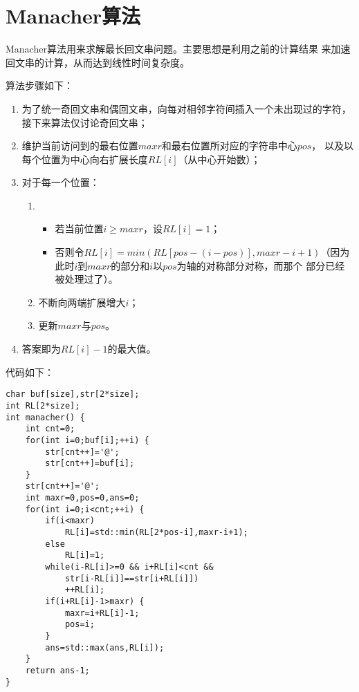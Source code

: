 \section{Manacher算法}
Manacher算法用来求解最长回文串问题。主要思想是利用之前的计算结果
来加速回文串的计算，从而达到线性时间复杂度。

算法步骤如下：
\begin{enumerate}
    \item 为了统一奇回文串和偶回文串，向每对相邻字符间插入一个未出现过的字符，
    接下来算法仅讨论奇回文串；
    \item 维护当前访问到的最右位置$maxr$和最右位置所对应的字符串中心$pos$，
    以及以每个位置为中心向右扩展长度$RL[i]$（从中心开始数）；
    \item 对于每一个位置：
    \begin{enumerate}
        \item
        \begin{itemize}
            \item 若当前位置$i\geq maxr$，设$RL[i]=1$；
            \item 否则令$RL[i]=min(RL[pos-(i-pos)],maxr-i+1)$（因为
            此时$i$到$maxr$的部分和$i$以$pos$为轴的对称部分对称，而那个
            部分已经被处理过了）。
        \end{itemize}
        \item 不断向两端扩展增大$i$；
        \item 更新$maxr$与$pos$。
    \end{enumerate}
    \item 答案即为$RL[i]-1$的最大值。
\end{enumerate}

代码如下：
\begin{lstlisting}
char buf[size],str[2*size];
int RL[2*size];
int manacher() {
    int cnt=0;
    for(int i=0;buf[i];++i) {
        str[cnt++]='@';
        str[cnt++]=buf[i];
    }
    str[cnt++]='@';
    int maxr=0,pos=0,ans=0;
    for(int i=0;i<cnt;++i) {
        if(i<maxr)
            RL[i]=std::min(RL[2*pos-i],maxr-i+1);
        else
            RL[i]=1;
        while(i-RL[i]>=0 && i+RL[i]<cnt &&
            str[i-RL[i]]==str[i+RL[i]])
            ++RL[i];
        if(i+RL[i]-1>maxr) {
            maxr=i+RL[i]-1;
            pos=i;
        }
        ans=std::max(ans,RL[i]);
    }
    return ans-1;
}
\end{lstlisting}
